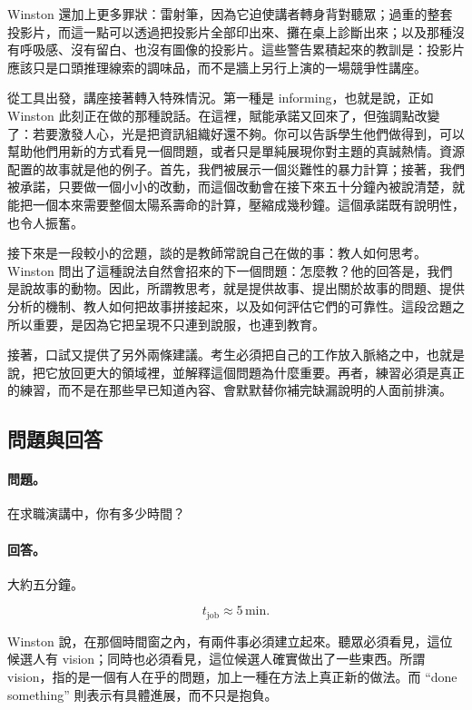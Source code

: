 Winston 還加上更多罪狀：雷射筆，因為它迫使講者轉身背對聽眾；過重的整套投影片，而這一點可以透過把投影片全部印出來、攤在桌上診斷出來；以及那種沒有呼吸感、沒有留白、也沒有圖像的投影片。這些警告累積起來的教訓是：投影片應該只是口頭推理線索的調味品，而不是牆上另行上演的一場競爭性講座。

從工具出發，講座接著轉入特殊情況。第一種是 informing，也就是說，正如 Winston 此刻正在做的那種說話。在這裡，賦能承諾又回來了，但強調點改變了：若要激發人心，光是把資訊組織好還不夠。你可以告訴學生他們做得到，可以幫助他們用新的方式看見一個問題，或者只是單純展現你對主題的真誠熱情。資源配置的故事就是他的例子。首先，我們被展示一個災難性的暴力計算；接著，我們被承諾，只要做一個小小的改動，而這個改動會在接下來五十分鐘內被說清楚，就能把一個本來需要整個太陽系壽命的計算，壓縮成幾秒鐘。這個承諾既有說明性，也令人振奮。

接下來是一段較小的岔題，談的是教師常說自己在做的事：教人如何思考。Winston 問出了這種說法自然會招來的下一個問題：怎麼教？他的回答是，我們是說故事的動物。因此，所謂教思考，就是提供故事、提出關於故事的問題、提供分析的機制、教人如何把故事拼接起來，以及如何評估它們的可靠性。這段岔題之所以重要，是因為它把呈現不只連到說服，也連到教育。

接著，口試又提供了另外兩條建議。考生必須把自己的工作放入脈絡之中，也就是說，把它放回更大的領域裡，並解釋這個問題為什麼重要。再者，練習必須是真正的練習，而不是在那些早已知道內容、會默默替你補完缺漏說明的人面前排演。

\subsection{問題與回答}

\paragraph{問題。} 在求職演講中，你有多少時間？

\paragraph{回答。} 大約五分鐘。

\begin{equation}
t_{\mathrm{job}} \approx 5\,\mathrm{min}.
\end{equation}

Winston 說，在那個時間窗之內，有兩件事必須建立起來。聽眾必須看見，這位候選人有 vision；同時也必須看見，這位候選人確實做出了一些東西。所謂 vision，指的是一個有人在乎的問題，加上一種在方法上真正新的做法。而 ``done something'' 則表示有具體進展，而不只是抱負。

